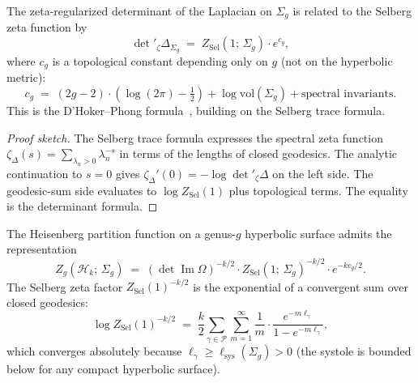 \begin{theorem}
\label{thm:thqg-I-determinant-formula}
The zeta-regularized determinant of the Laplacian on $\Sigma_g$ is related to the Selberg zeta function by
\begin{equation}%
\det{}'_\zeta \Delta_{\Sigma_g} \;=\; Z_{\mathrm{Sel}}(1;\,\Sigma_g) \cdot e^{c_g},
\end{equation}
where $c_g$ is a topological constant depending only on $g$ (not on the hyperbolic metric):
\begin{equation}%
c_g \;=\; (2g - 2) \cdot \left( \log(2\pi) - \tfrac{1}{2} \right) + \log\mathrm{vol}(\Sigma_g) + \text{spectral invariants}.
\end{equation}
This is the D'Hoker--Phong formula~\cite{DP86}, building on the Selberg trace formula.
\end{theorem}

\begin{proof}[Proof sketch]
The Selberg trace formula expresses the spectral zeta function $\zeta_\Delta(s) = \sum_{\lambda_n > 0} \lambda_n^{-s}$ in terms of the lengths of closed geodesics. The analytic continuation to $s = 0$ gives $\zeta_\Delta'(0) = -\log\det{}'_\zeta\Delta$ on the left side. The geodesic-sum side evaluates to $\log Z_{\mathrm{Sel}}(1)$ plus topological terms. The equality is the determinant formula.
\end{proof}

\begin{corollary}
\label{cor:thqg-I-heisenberg-selberg}
The Heisenberg partition function on a genus-$g$ hyperbolic surface admits the representation
\begin{equation}%
Z_g(\mathcal{H}_k;\,\Sigma_g) \;=\; (\det\operatorname{Im}\Omega)^{-k/2} \cdot Z_{\mathrm{Sel}}(1;\,\Sigma_g)^{-k/2} \cdot e^{-k c_g / 2}.
\end{equation}
The Selberg zeta factor $Z_{\mathrm{Sel}}(1)^{-k/2}$ is the exponential of a convergent sum over closed geodesics:
\begin{equation}%
\log Z_{\mathrm{Sel}}(1)^{-k/2} \;=\; \frac{k}{2} \sum_{\gamma \in \mathcal{P}} \sum_{m=1}^{\infty} \frac{1}{m} \cdot \frac{e^{-m\ell_\gamma}}{1 - e^{-m\ell_\gamma}},
\end{equation}
which converges absolutely because $\ell_\gamma \geq \ell_{\mathrm{sys}}(\Sigma_g) > 0$ (the systole is bounded below for any compact hyperbolic surface).
\end{corollary}

